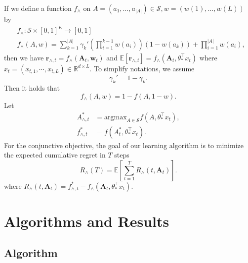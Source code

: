 \documentclass{article}
\newcommand{\EE}{\mathbb{E}}
\newcommand{\RR}{\mathbb{R}}
\newcommand{\bA}{\mathbf{A}}
\newcommand{\br}{\mathbf{r}}
\newcommand{\bw}{\mathbf{w}}
\newcommand{\cS}{\mathcal{S}}
\newcommand{\argmax}{\mathrm{argmax}}
\newcommand{\abs}[1]{\left| #1 \right|}
\begin{document}
If we define a function $f_{\wedge}$ on $A = (a_1, \ldots, a_{\abs{A}}) \in \cS, w = (w(1), \ldots, w(L))$ by
\begin{align*}
&f_{\wedge} : \cS \times [0,1]^E \to [0,1]\\
&f_{\wedge}(A,w) = \sum_{k = 1}^{\abs{A}} \gamma_k' (\prod_{i = 1}^{k - 1} w(a_i))(1 - w(a_k)) + \prod_{i=1}^{\abs{A}}w(a_i),
\end{align*}
then we have $\br_{\wedge, t} = f_{\wedge}(\bA_t, \bw_t)$ and $\EE[\br_{\wedge, t}] = f_{\wedge}(\bA_t, \theta_{\ast}^{\top}x_t)$ where $x_t = (x_{t,1}, \cdots, x_{t,L}) \in \RR^{d \times L}$. To simplify notations, we assume 
$$
\gamma_k' = 1 - \gamma_k.
$$
Then it holds that
\begin{equation}
\label{eq:ConDisRelation}
f_{\wedge}(A, w) = 1 - f(A, 1 - w).
\end{equation}
Let 
\begin{align*}
A_{\wedge, t}^{\ast} &= \argmax_{A\in \cS} f(A,\theta_{\ast}^{\top}x_t),\\
f_{\wedge, t}^{\ast} &= f(A_t^{\ast}, \theta_{\ast}^{\top}x_t).
\end{align*}
For the conjunctive objective, the goal of our learning algorithm is to minimize the expected cumulative regret in $T$ steps
$$
R_{\wedge}(T) = \EE[\sum_{t=1}^T R_{\wedge}(t, \bA_t)].
$$
where $R_{\wedge}(t, \bA_t) = f_{\wedge, t}^{\ast} - f_{\wedge}(\bA_t, \theta_{\ast}^{\top}x_t)$.



\section{Algorithms and Results}

\subsection{Algorithm}
	
\end{document}

